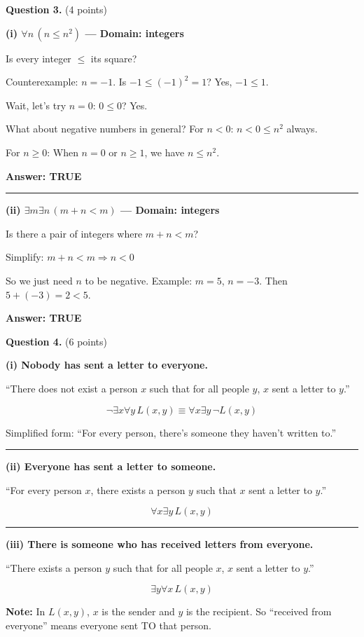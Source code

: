 \documentclass[11pt,a4paper]{article}
\begin{document}
\vspace{15pt}

\textbf{Question 3.} (4 points)

\begin{solnbox}
\textbf{(i) $\forall n\, (n \leq n^2)$ --- Domain: integers}

Is every integer $\leq$ its square?

Counterexample: $n = -1$. Is $-1 \leq (-1)^2 = 1$? Yes, $-1 \leq 1$. \checkmark

Wait, let's try $n = 0$: $0 \leq 0$? Yes. \checkmark

What about negative numbers in general? For $n < 0$: $n < 0 \leq n^2$ always. \checkmark

For $n \geq 0$: When $n = 0$ or $n \geq 1$, we have $n \leq n^2$. \checkmark

\textbf{Answer: TRUE}

\rule{\linewidth}{0.3pt}

\textbf{(ii) $\exists m \exists n\, (m + n < m)$ --- Domain: integers}

Is there a pair of integers where $m + n < m$?

Simplify: $m + n < m \Rightarrow n < 0$

So we just need $n$ to be negative. Example: $m = 5$, $n = -3$. Then $5 + (-3) = 2 < 5$. \checkmark

\textbf{Answer: TRUE}
\end{solnbox}

\vspace{15pt}

\textbf{Question 4.} (6 points)

\begin{solnbox}
\textbf{(i) Nobody has sent a letter to everyone.}

``There does not exist a person $x$ such that for all people $y$, $x$ sent a letter to $y$.''

$$\neg \exists x \forall y\, L(x, y) \equiv \boxed{\forall x \exists y\, \neg L(x, y)}$$

Simplified form: ``For every person, there's someone they haven't written to.''

\rule{\linewidth}{0.3pt}

\textbf{(ii) Everyone has sent a letter to someone.}

``For every person $x$, there exists a person $y$ such that $x$ sent a letter to $y$.''

$$\boxed{\forall x \exists y\, L(x, y)}$$

\rule{\linewidth}{0.3pt}

\textbf{(iii) There is someone who has received letters from everyone.}

``There exists a person $y$ such that for all people $x$, $x$ sent a letter to $y$.''

$$\boxed{\exists y \forall x\, L(x, y)}$$

\textbf{Note:} In $L(x, y)$, $x$ is the sender and $y$ is the recipient. So ``received from everyone'' means everyone sent TO that person.
\end{solnbox}
\end{document}
